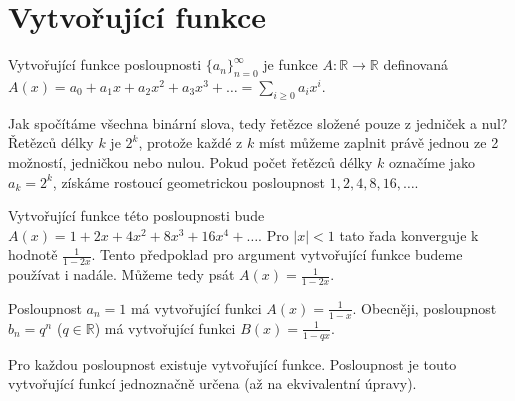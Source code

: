 \section{Vytvořující funkce}
\begin{t_definition}
  Vytvořující funkce posloupnosti $\{a_n\}_{n=0}^\infty$ je funkce $A:\mathbb{R}\rightarrow\mathbb{R}$ definovaná $A(x)=a_0+a_1x+a_2x^2+a_3x^3+\dots=\sum_{i\geq 0}a_ix^i$.
\end{t_definition}

\begin{t_example}
  Jak spočítáme všechna binární slova, tedy řetězce složené pouze z jedniček a nul? Řetězců délky $k$ je $2^k$, protože každé z $k$ míst můžeme zaplnit právě jednou ze 2 možností, jedničkou nebo nulou. Pokud počet řetězců délky $k$ označíme jako  $a_k=2^k$, získáme rostoucí geometrickou posloupnost $1,2,4,8,16,\dots$.
  
  Vytvořující funkce této posloupnosti bude $A(x)=1+2x+4x^2+8x^3+16x^4+\dots$. Pro $|x|<1$ tato řada konverguje k hodnotě $\frac{1}{1-2x}$. Tento předpoklad pro argument vytvořující funkce budeme používat i nadále. Můžeme tedy psát $A(x)=\frac{1}{1-2x}$.
\end{t_example}

\begin{t_observation}
  Posloupnost $a_n=1$ má vytvořující funkci $A(x)=\frac{1}{1-x}$. Obecněji, posloupnost $b_n=q^n$ ($q\in\mathbb{R}$) má vytvořující funkci $B(x)=\frac{1}{1-qx}$.
\end{t_observation}

\begin{t_fact}
  Pro každou posloupnost existuje vytvořující funkce. Posloupnost je touto vytvořující funkcí jednoznačně určena (až na ekvivalentní úpravy).
\end{t_fact}

